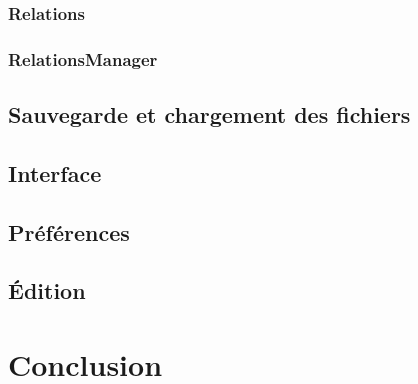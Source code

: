 \documentclass[a4paper,12pt]{report}
\begin{document}
\subsection{Relations}

\subsection{RelationsManager}

\section{Sauvegarde et chargement des fichiers}

\section{Interface}

\section{Préférences}

\section{Édition}

\chapter{Conclusion}
\end{document}
